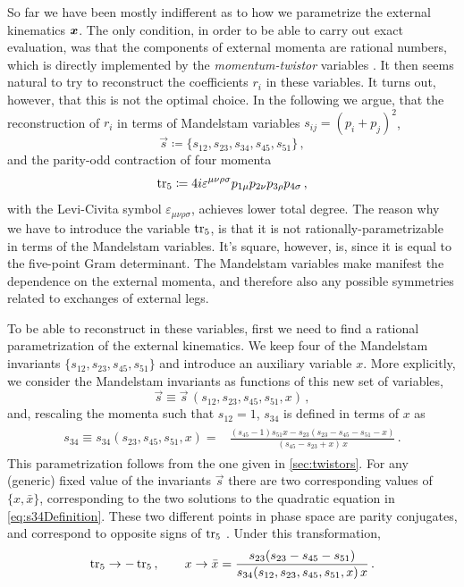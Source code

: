 So far we have been mostly indifferent as to how we parametrize the external kinematics $\vb*{x}$.
The only condition, in order to be able to carry out exact evaluation, was that the components of external momenta
are rational numbers, which is directly implemented by the \emph{momentum-twistor} variables \cite{Hodges:2009hk}.
It then seems natural to try to reconstruct the coefficients $r_i$ in these variables.
It turns out, however, that this is not the optimal choice.
In the following we argue, that the reconstruction of $r_i$ in terms of Mandelstam variables $s_{ij}=(p_{i}+p_j)^2$, 
\begin{equation}\label{eq:mandelstams}
\vec s \coloneqq \{s_{12},s_{23},s_{34},s_{45},s_{51}\}\,,
\end{equation}
and the parity-odd contraction of four 
momenta 
\begin{equation}\label{eq:tr5Def}
\operatorname{tr_5} \coloneqq  4 i \varepsilon^{\mu\nu\rho\sigma}
p_{1\mu} p_{2\nu} p_{3\rho} p_{4\sigma}\, ,
\end{equation}
with the Levi-Civita symbol $\varepsilon_{\mu\nu\rho\sigma}$, achieves lower total degree.
The reason why we have to introduce the variable $\operatorname{tr_5}$, is that 
it is not rationally-parametrizable in terms of the Mandelstam variables.
It's square, however, is, since it is equal to the five-point Gram determinant.
The Mandelstam variables 
make manifest the dependence on
the external momenta, and therefore also any possible symmetries related to 
exchanges of external legs.

To be able to reconstruct in these variables, first we need to find a rational 
parametrization of the external kinematics.
We keep four of the Mandelstam invariants
$\{ s_{12}, s_{23}, s_{45}, s_{51} \}$ and introduce an auxiliary variable $x$.
More explicitly, we consider the Mandelstam invariants as functions of
this new set of variables,
\begin{equation}
  \vec s\equiv \vec s\,(s_{12}, s_{23}, s_{45}, s_{51},x)\,,
\end{equation}
and, rescaling the momenta such that $s_{12}=1$, $s_{34}$ is defined in terms of
$x$ as
\begin{align}
\begin{split}
  s_{34}\equiv
    s_{34}(s_{23}, s_{45} , s_{51}, x) =& \frac{ (s_{45} - 1) s_{51} x -
	s_{23} (s_{23} -  s_{45} - s_{51} - x)}{(s_{45} - s_{23} + x)\,x}\,.
    \label{eq:s34Definition}
\end{split}
\end{align}
This parametrization follows from the one given in \cref{sec:twistors}.
For any (generic) fixed value of the invariants $\vec s$
there are two corresponding values of $\{x,\bar x\}$, corresponding to the 
two solutions to the quadratic equation in \eqref{eq:s34Definition}.
These two different points in phase space are parity conjugates, 
and correspond to opposite signs of $\operatorname{tr_5}$ . 
Under this transformation,
\begin{align} 
  \label{eq:parity}
  \operatorname{tr_5}\to-\operatorname{tr_5}\,,\qquad
  x\to\bar x=
  \frac{s_{23}(s_{23}-s_{45}-s_{51})}{s_{34}(s_{12}, s_{23}, s_{45}, s_{51},x)\,x}\,.
\end{align}


